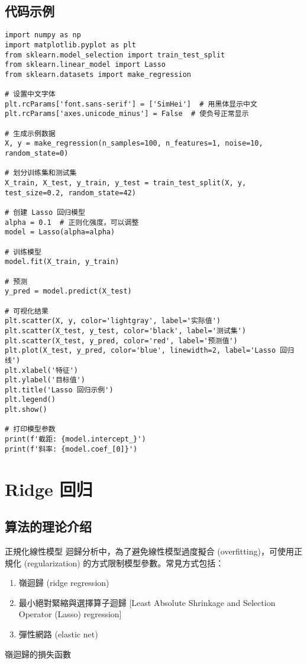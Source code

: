 \subsection*{代码示例}
\begin{lstlisting}
import numpy as np
import matplotlib.pyplot as plt
from sklearn.model_selection import train_test_split
from sklearn.linear_model import Lasso
from sklearn.datasets import make_regression

# 设置中文字体
plt.rcParams['font.sans-serif'] = ['SimHei']  # 用黑体显示中文
plt.rcParams['axes.unicode_minus'] = False  # 使负号正常显示

# 生成示例数据
X, y = make_regression(n_samples=100, n_features=1, noise=10, random_state=0)

# 划分训练集和测试集
X_train, X_test, y_train, y_test = train_test_split(X, y, test_size=0.2, random_state=42)

# 创建 Lasso 回归模型
alpha = 0.1  # 正则化强度，可以调整
model = Lasso(alpha=alpha)

# 训练模型
model.fit(X_train, y_train)

# 预测
y_pred = model.predict(X_test)

# 可视化结果
plt.scatter(X, y, color='lightgray', label='实际值')
plt.scatter(X_test, y_test, color='black', label='测试集')
plt.scatter(X_test, y_pred, color='red', label='预测值')
plt.plot(X_test, y_pred, color='blue', linewidth=2, label='Lasso 回归线')
plt.xlabel('特征')
plt.ylabel('目标值')
plt.title('Lasso 回归示例')
plt.legend()
plt.show()

# 打印模型参数
print(f'截距: {model.intercept_}')
print(f'斜率: {model.coef_[0]}')

\end{lstlisting}

\section{Ridge 回归}
\subsection*{算法的理论介绍}

正規化線性模型
迴歸分析中，為了避免線性模型過度擬合 (overfitting)，可使用正規化 (regularization) 的方式限制模型參數。常見方式包括：

\begin{enumerate}
    \item 嶺迴歸 (ridge regression)
    \item 最小絕對緊縮與選擇算子迴歸 [Least Absolute Shrinkage and Selection Operator (Lasso) regression]
    \item 彈性網路 (elastic net)
\end{enumerate}
嶺迴歸的損失函數

